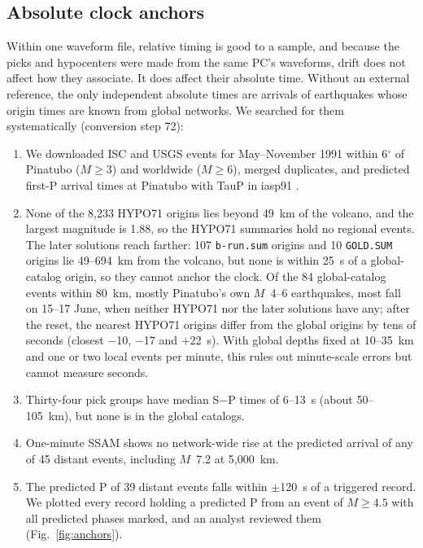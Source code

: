 \documentclass[linenum]{SSA-SRL}
\newcommand{\file}[1]{\texttt{#1}}
\begin{document}
\subsection{Absolute clock anchors}

Within one waveform file, relative timing is good to a sample, and because the picks and hypocenters were made from the same PC's waveforms, drift does not affect how they associate. It does affect their absolute time. Without an external reference, the only independent absolute times are arrivals of earthquakes whose origin times are known from global networks. We searched for them systematically (conversion step 72):
\begin{enumerate}
\item We downloaded ISC \citep{ISC_2024} and USGS \citep{USGS_2017} events for May--November 1991 within 6$^\circ$ of Pinatubo ($M \ge 3$) and worldwide ($M \ge 6$), merged duplicates, and predicted first-P arrival times at Pinatubo with TauP \citep{Crotwell_1999} in iasp91 \citep{Kennett_1991}.
\item None of the 8,233 HYPO71 origins lies beyond 49~km of the volcano, and the largest magnitude is 1.88, so the HYPO71 summaries hold no regional events. The later solutions reach farther: 107 \file{b-run.sum} origins and 10 \file{GOLD.SUM} origins lie 49--694~km from the volcano, but none is within 25~s of a global-catalog origin, so they cannot anchor the clock. Of the 84 global-catalog events within 80~km, mostly Pinatubo's own $M$~4--6 earthquakes, most fall on 15--17 June, when neither HYPO71 nor the later solutions have any; after the reset, the nearest HYPO71 origins differ from the global origins by tens of seconds (closest $-$10, $-$17 and $+$22~s). With global depths fixed at 10--35~km and one or two local events per minute, this rules out minute-scale errors but cannot measure seconds.
\item Thirty-four pick groups have median S$-$P times of 6--13~s (about 50--105~km), but none is in the global catalogs.
\item One-minute SSAM shows no network-wide rise at the predicted arrival of any of 45 distant events, including $M$~7.2 at 5,000~km.
\item The predicted P of 39 distant events falls within $\pm$120~s of a triggered record. We plotted every record holding a predicted P from an event of $M \ge 4.5$ with all predicted phases marked, and an analyst reviewed them (Fig.~\ref{fig:anchors}).
\end{enumerate}
\end{document}
